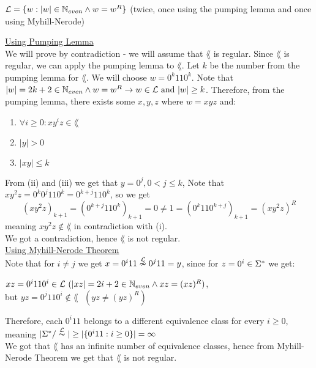 $\mathcal{L}=\{w : |w| \in \mathbb{N}_{even} \wedge w = w^R\}$
(twice, once using the pumping lemma and once using Myhill-Nerode)

\underline{Using Pumping Lemma} \\

We will prove by contradiction - we will assume that $\lang$ is regular.
Since $\lang$ is regular, we can apply the pumping lemma to $\lang$. Let $k$
be the number from the pumping lemma for $\lang$. We will choose $w = 0^k 11 0^k $.
Note that $|w|=2k+2 \in \mathbb{N}_{even} \wedge w=w^R \rightarrow w \in \mathcal{L} \text{ and } |w| \geq k$.
Therefore, from the pumping lemma, there exists some $x, y, z$ where $w = xyz$ and:

\begin{enumerate}
    \item $\forall i \geq 0: x y^i z \in \lang$
    \item $|y| > 0$
    \item $|xy| \leq k$
\end{enumerate}

From (ii) and (iii) we get that $y=0^j, 0 < j \leq k$,
Note that $x y^2 z = 0^k 0^j 11 0^k = 0^{k+j} 11 0^k$,
so we get
\[
    (x y^2 z)_{k+1} = (0^{k+j} 11 0^k)_{k+1} = 0 \neq
    1 = (0^k 11 0^{k+j})_{k+1} = (x y^2 z)^R
\]
meaning $x y^2 z \notin \lang$ in contradiction with (i). \\
We got a contradiction, hence $\lang$ is not regular. \\

\underline{Using Myhill-Nerode Theorem} \\

Note that for $i \neq j$ we get $x = 0^i 11 \overset{\mathcal{L}}{\nsim} 0^j 11 = y$,
since for $z=0^i \in \Sigma^*$ we get:

$xz = 0^i 11 0^i \in \mathcal{L} \text{ } (|xz|=2i+2 \in \mathbb{N}_{even} \wedge xz=(xz)^R)$, \\
but $yz = 0^j 11 0^i \notin \lang \text{ } (yz \neq (yz)^R)$

Therefore, each $ 0^i 11 $ belongs to a different equivalence class for every $i \geq 0$, \\
meaning $|\Sigma^* / \overset{\mathcal{L}}{\thicksim}| \geq |\{0^i 11: i \geq 0\}| = \infty$ \\
We got that $\lang$ has an infinite number of equivalence classes, hence from
Myhill-Nerode Theorem we get that $\lang$ is not regular. \\